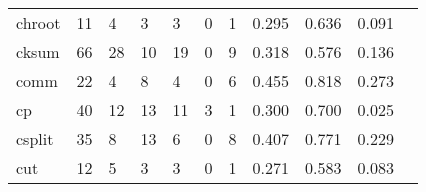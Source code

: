 \begin{longtable}{lp{1.2cm}p{1.2cm}p{1.2cm}p{1.2cm}p{1.2cm}p{1.2cm}p{1.2cm}p{1.2cm}p{1.2cm}p{1.2cm}}
chroot    &                                    11 &                                                  4 &                                                  3 &                                                  3 &                                                  0 &                                                  1 &                                              0.295 &                                              0.636 &                                              0.091 \\
cksum     &                                    66 &                                                 28 &                                                 10 &                                                 19 &                                                  0 &                                                  9 &                                              0.318 &                                              0.576 &                                              0.136 \\
comm      &                                    22 &                                                  4 &                                                  8 &                                                  4 &                                                  0 &                                                  6 &                                              0.455 &                                              0.818 &                                              0.273 \\
cp        &                                    40 &                                                 12 &                                                 13 &                                                 11 &                                                  3 &                                                  1 &                                              0.300 &                                              0.700 &                                              0.025 \\
csplit    &                                    35 &                                                  8 &                                                 13 &                                                  6 &                                                  0 &                                                  8 &                                              0.407 &                                              0.771 &                                              0.229 \\
cut       &                                    12 &                                                  5 &                                                  3 &                                                  3 &                                                  0 &                                                  1 &                                              0.271 &                                              0.583 &                                              0.083 \\

\end{longtable}
